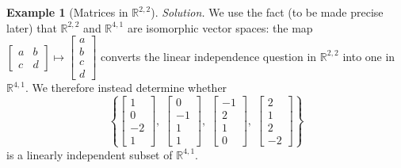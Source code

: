 \documentclass[11pt, a4paper, notitlepage]{report}
\theoremstyle{definition}
\newtheorem{example}[theorem]{Example}
\theoremstyle{remark}
\begin{document}
\begin{example}[Matrices in $\mathbb{R}^{2,2}$]
\emph{Solution.} We use the fact (to be made precise later) that $\mathbb{R}^{2,2}$ and $\mathbb{R}^{4,1}$ are isomorphic vector spaces: the map $\begin{bmatrix}a&b\\c&d\end{bmatrix}\mapsto\begin{bmatrix}a\\b\\c\\d\end{bmatrix}$ converts the linear independence question in $\mathbb{R}^{2,2}$ into one in $\mathbb{R}^{4,1}$. We therefore instead determine whether
\[
  \left\{
    \begin{bmatrix}1\\0\\-2\\1\end{bmatrix},\;
    \begin{bmatrix}0\\-1\\1\\1\end{bmatrix},\;
    \begin{bmatrix}-1\\2\\1\\0\end{bmatrix},\;
    \begin{bmatrix}2\\1\\2\\-2\end{bmatrix}
  \right\}
\]
is a linearly independent subset of $\mathbb{R}^{4,1}$.


\end{example}
\end{document}

